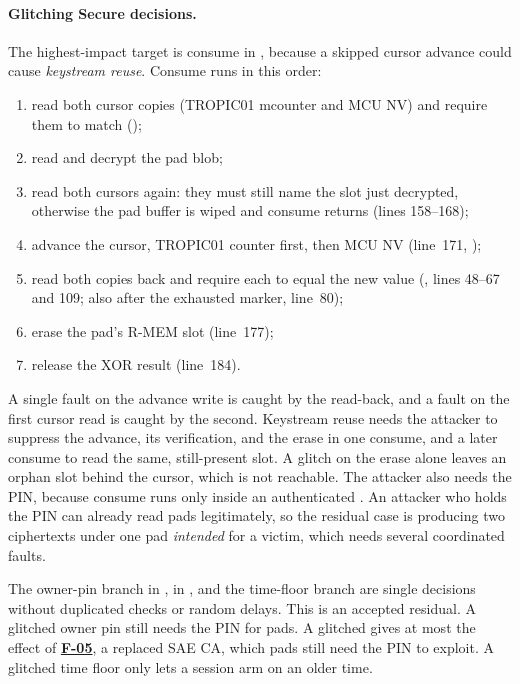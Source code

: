 \documentclass[11pt,a4paper]{article}
\newcommand{\fid}[1]{\textbf{#1}}
\begin{document}
\paragraph{Glitching Secure decisions.} The highest-impact target is consume in , because a skipped cursor advance could cause \emph{keystream reuse}. Consume runs in this order:
\begin{enumerate}
\item read both cursor copies (TROPIC01 mcounter and MCU NV) and require them to match ();
\item read and decrypt the pad blob;
\item read both cursors again: they must still name the slot just decrypted, otherwise the pad buffer is wiped and consume returns  (lines 158--168);
\item advance the cursor, TROPIC01 counter first, then MCU NV (line~171, );
\item read both copies back and require each to equal the new value (,  lines 48--67 and 109; also after the exhausted marker, line~80);
\item erase the pad's R-MEM slot (line~177);
\item release the XOR result (line~184).
\end{enumerate}
A single fault on the advance write is caught by the read-back, and a fault on the first cursor read is caught by the second. Keystream reuse needs the attacker to suppress the advance, its verification, and the erase in one consume, and a later consume to read the same, still-present slot. A glitch on the erase alone leaves an orphan slot behind the cursor, which is not reachable. The attacker also needs the PIN, because consume runs only inside an authenticated . An attacker who holds the PIN can already read pads legitimately, so the residual case is producing two ciphertexts under one pad \emph{intended} for a victim, which needs several coordinated faults.

The owner-pin branch in ,  in , and the time-floor branch are single decisions without duplicated checks or random delays. This is an accepted residual. A glitched owner pin still needs the PIN for pads. A glitched  gives at most the effect of \hyperref[f:F-05]{\fid{F-05}}, a replaced SAE CA, which pads still need the PIN to exploit. A glitched time floor only lets a session arm on an older time.
\end{document}
